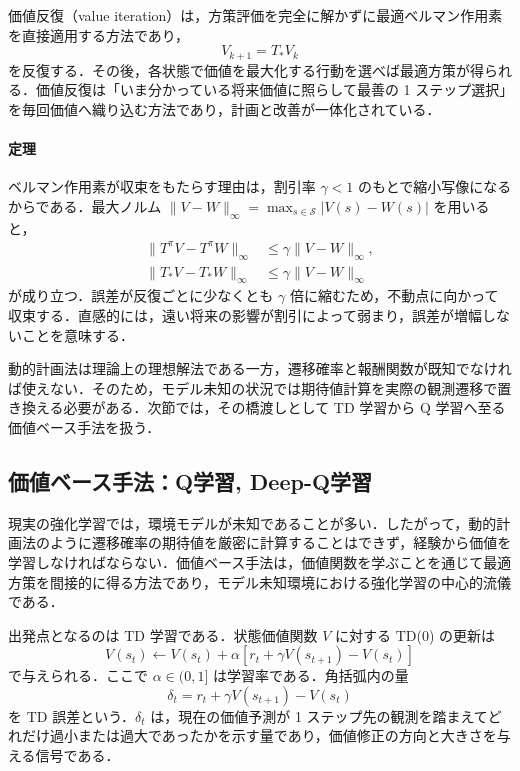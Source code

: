価値反復（value iteration）は，方策評価を完全に解かずに最適ベルマン作用素を直接適用する方法であり，
\begin{equation*}
V_{k+1} = T_\ast V_k
\end{equation*}
を反復する．その後，各状態で価値を最大化する行動を選べば最適方策が得られる．価値反復は「いま分かっている将来価値に照らして最善の 1 ステップ選択」を毎回価値へ織り込む方法であり，計画と改善が一体化されている．

\paragraph*{定理}
ベルマン作用素が収束をもたらす理由は，割引率 $\gamma < 1$ のもとで縮小写像になるからである．最大ノルム $\|V-W\|_\infty = \max_{s \in \mathcal{S}} |V(s)-W(s)|$ を用いると，
\begin{align*}
\|T^\pi V - T^\pi W\|_\infty &\le \gamma \|V-W\|_\infty, \\
\|T_\ast V - T_\ast W\|_\infty &\le \gamma \|V-W\|_\infty
\end{align*}
が成り立つ．誤差が反復ごとに少なくとも $\gamma$ 倍に縮むため，不動点に向かって収束する．直感的には，遠い将来の影響が割引によって弱まり，誤差が増幅しないことを意味する．

動的計画法は理論上の理想解法である一方，遷移確率と報酬関数が既知でなければ使えない．そのため，モデル未知の状況では期待値計算を実際の観測遷移で置き換える必要がある．次節では，その橋渡しとして TD 学習から Q 学習へ至る価値ベース手法を扱う．

\subsection{価値ベース手法：Q学習, Deep-Q学習}

現実の強化学習では，環境モデルが未知であることが多い．したがって，動的計画法のように遷移確率の期待値を厳密に計算することはできず，経験から価値を学習しなければならない．価値ベース手法は，価値関数を学ぶことを通じて最適方策を間接的に得る方法であり，モデル未知環境における強化学習の中心的流儀である．

出発点となるのは TD 学習である．状態価値関数 $V$ に対する TD(0) の更新は
\begin{equation*}
V(s_t)
\leftarrow
V(s_t) + \alpha
\left[
r_t + \gamma V(s_{t+1}) - V(s_t)
\right]
\end{equation*}
で与えられる．ここで $\alpha \in (0,1]$ は学習率である．角括弧内の量
\begin{equation*}
\delta_t = r_t + \gamma V(s_{t+1}) - V(s_t)
\end{equation*}
を TD 誤差という．$\delta_t$ は，現在の価値予測が 1 ステップ先の観測を踏まえてどれだけ過小または過大であったかを示す量であり，価値修正の方向と大きさを与える信号である．

